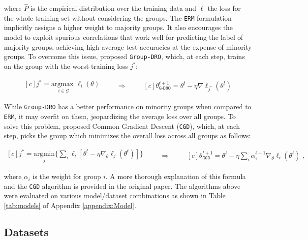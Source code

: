 where $\hat{P}$ is the empirical distribution over the training data and $\ell$ the loss for the whole training set without considering the groups. The \texttt{ERM} formulation implicitly assigns a higher weight to majority groups. It also encourages the model to exploit spurious correlations that work well for predicting the label of majority groups, achieving high average test accuracies at the expense of minority groups. To overcome this issue, \citet{sagawa2020distributionally} proposed \texttt{Group-DRO}, which, at each step, trains on the group with the worst training loss $j^*$:

\begin{equation}
\begin{aligned}[c]
j^* = \underset{i\in \mathcal{G}}{\text{argmax }}{\ell_i (\theta)}
\end{aligned}
\qquad\Rightarrow\qquad
\begin{aligned}[c]
\theta^{t+1}_{\texttt{G-DRO}} = \theta^t-\eta\nabla \ell_{j^*}(\theta^t)
\end{aligned}
\label{eq:gdro_algo}
\end{equation}


While \texttt{Group-DRO} has a better performance on minority groups when compared to \texttt{ERM}, it may overfit on them, jeopardizing the average loss over all groups. To solve this problem, \citet{piratla2022focus} proposed Common Gradient Descent (\texttt{CGD}), which, at each step, picks the group which minimizes the overall loss across all groups as follows:


\begin{equation}
\begin{aligned}[c]
j^* = \underset{j}{\text{argmin}}\{\sum_i\ell_i[\theta^t-\eta\nabla_{\theta}\ell_{j}(\theta^t)]\}
\end{aligned}
\qquad\Rightarrow\qquad
\begin{aligned}[c]
\theta^{t+1}_{\texttt{CGD}} = \theta^t-\eta\sum_i{\alpha_i^{t+1}}\nabla_{\theta}\ell_{i}(\theta^t) \text{ ,}
\end{aligned}
\label{eq:cgd_algo}
\end{equation}

where $\alpha_i$ is the weight for group $i$. A more thorough explanation of this formula and the \texttt{CGD} algorithm is provided in the original paper. The algorithms above were evaluated on various model/dataset combinations as shown in Table \ref{tab:models} of Appendix \ref{appendix:Model}.

\subsection{Datasets}
\label{sec:datasets}

